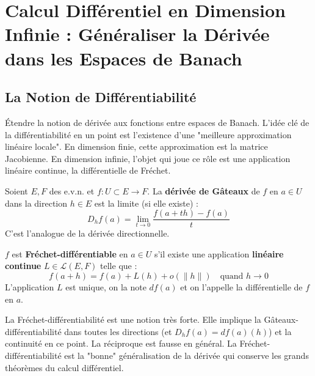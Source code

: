 \chapter{Calcul Différentiel en Dimension Infinie : Généraliser la Dérivée dans les Espaces de Banach}

\section{La Notion de Différentiabilité}

\begin{objectif}
    Étendre la notion de dérivée aux fonctions entre espaces de Banach. L'idée clé de la différentiabilité en un point est l'existence d'une "meilleure approximation linéaire locale". En dimension finie, cette approximation est la matrice Jacobienne. En dimension infinie, l'objet qui joue ce rôle est une application linéaire continue, la différentielle de Fréchet.
\end{objectif}

\begin{definition}
    Soient $E, F$ des e.v.n. et $f: U \subset E \to F$. La \textbf{dérivée de Gâteaux} de $f$ en $a \in U$ dans la direction $h \in E$ est la limite (si elle existe) :
    $$ D_h f(a) = \lim_{t \to 0} \frac{f(a+th)-f(a)}{t} $$
    C'est l'analogue de la dérivée directionnelle.
\end{definition}

\begin{definition}
    $f$ est \textbf{Fréchet-différentiable} en $a \in U$ s'il existe une application \textbf{linéaire continue} $L \in \mathcal{L}(E,F)$ telle que :
    $$ f(a+h) = f(a) + L(h) + o(\|h\|) \quad \text{quand } h \to 0 $$
    L'application $L$ est unique, on la note $df(a)$ et on l'appelle la différentielle de $f$ en $a$.
\end{definition}

\begin{remark}
    La Fréchet-différentiabilité est une notion très forte. Elle implique la Gâteaux-différentiabilité dans toutes les directions (et $D_h f(a) = df(a)(h)$) et la continuité en ce point. La réciproque est fausse en général. La Fréchet-différentiabilité est la "bonne" généralisation de la dérivée qui conserve les grands théorèmes du calcul différentiel.
\end{remark}

